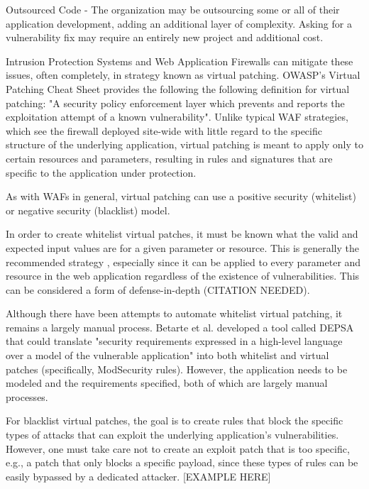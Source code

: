 \item Outsourced Code - The organization may be outsourcing some or all of their application development, adding an additional layer of complexity. Asking for a vulnerability fix may require an entirely new project and additional cost.

Intrusion Protection Systems and Web Application Firewalls can mitigate these issues, often completely, in strategy known as virtual patching. OWASP's Virtual Patching Cheat Sheet \cite{virtualpatchingcheat} provides the following the following definition for virtual patching:
"A security policy enforcement layer which prevents and reports the exploitation attempt of a known vulnerability". 
Unlike typical WAF strategies, which see the firewall deployed site-wide with little regard to the specific structure of the underlying application, virtual patching is meant to apply only to certain resources and parameters, resulting in rules and signatures that are specific to the  application under protection. 

As with WAFs in general, virtual patching can use a positive security (whitelist) or negative security (blacklist) model. 

In order to create whitelist virtual patches, it must be known what the valid and expected input values are for a given parameter or resource. This is generally the recommended strategy \cite{owaspvirtualpatchingcheat}, especially since it can be applied to every parameter and resource in the web application regardless of the existence of vulnerabilities. This can be considered a form of defense-in-depth (CITATION NEEDED). 

Although there have been attempts to automate whitelist virtual patching, it remains a largely manual process. Betarte et al. \cite{betarte_towards_2016} developed a tool called DEPSA that could translate "security requirements expressed in a high-level language over a model of the vulnerable application" into both whitelist and virtual patches (specifically, ModSecurity rules). However, the application needs to be modeled and the requirements specified, both of which are largely manual processes.

For blacklist virtual patches, the goal is to create rules that block the specific types of attacks that can exploit the underlying application's vulnerabilities. However, one must take care not to create an exploit patch that is too specific, e.g., a patch that only blocks a specific payload, since these types of rules can be easily bypassed by a dedicated attacker. [EXAMPLE HERE]

